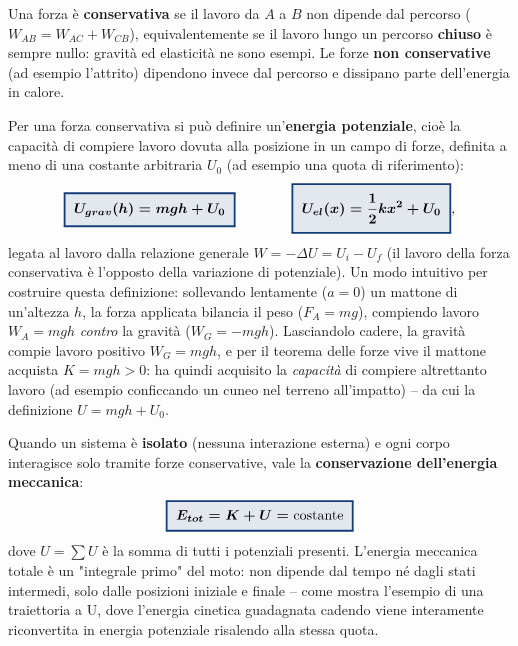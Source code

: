 \documentclass[a4paper,11pt]{article}
\newcommand{\keyeq}[1]{{\setlength{\fboxsep}{6pt}\setlength{\fboxrule}{1.3pt}\fcolorbox{chapblue}{chapblue!12}{\boldmath$\displaystyle #1$}}}
\begin{document}
Una forza è \textbf{conservativa} se il lavoro da $A$ a $B$ non dipende dal percorso ($W_{AB}=W_{AC}+W_{CB}$), equivalentemente se il lavoro lungo un percorso \textbf{chiuso} è sempre nullo: gravità ed elasticità ne sono esempi. Le forze \textbf{non conservative} (ad esempio l'attrito) dipendono invece dal percorso e dissipano parte dell'energia in calore.

Per una forza conservativa si può definire un'\textbf{energia potenziale}, cioè la capacità di compiere lavoro dovuta alla posizione in un campo di forze, definita a meno di una costante arbitraria $U_0$ (ad esempio una quota di riferimento):
\[
\keyeq{U_{grav}(h) = mgh + U_0} \qquad\qquad \keyeq{U_{el}(x) = \frac12 kx^2 + U_0},
\]
legata al lavoro dalla relazione generale $W=-\Delta U=U_i-U_f$ (il lavoro della forza conservativa è l'opposto della variazione di potenziale). Un modo intuitivo per costruire questa definizione: sollevando lentamente ($a=0$) un mattone di un'altezza $h$, la forza applicata bilancia il peso ($F_A=mg$), compiendo lavoro $W_A=mgh$ \emph{contro} la gravità ($W_G=-mgh$). Lasciandolo cadere, la gravità compie lavoro positivo $W_G=mgh$, e per il teorema delle forze vive il mattone acquista $K=mgh>0$: ha quindi acquisito la \emph{capacità} di compiere altrettanto lavoro (ad esempio conficcando un cuneo nel terreno all'impatto) -- da cui la definizione $U=mgh+U_0$.

Quando un sistema è \textbf{isolato} (nessuna interazione esterna) e ogni corpo interagisce solo tramite forze conservative, vale la \textbf{conservazione dell'energia meccanica}:
\[
\keyeq{E_{tot} = K + U = \text{costante}}
\]
dove $U=\sum U$ è la somma di tutti i potenziali presenti. L'energia meccanica totale è un "integrale primo" del moto: non dipende dal tempo né dagli stati intermedi, solo dalle posizioni iniziale e finale -- come mostra l'esempio di una traiettoria a U, dove l'energia cinetica guadagnata cadendo viene interamente riconvertita in energia potenziale risalendo alla stessa quota.

\begin{center}
\end{center}
\end{document}
